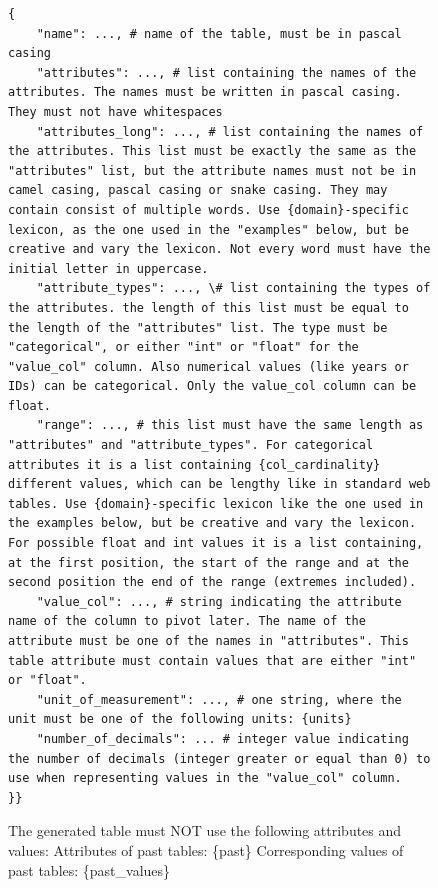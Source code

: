 \begin{figure}[t!]
\begin{tcolorbox}[
  title=Relational generation prompt,
  fonttitle=\bfseries,
  sharp corners=all
]
\begin{Verbatim}[fontsize=\small, breaklines=true, breakanywhere=true]
{
    "name": ..., # name of the table, must be in pascal casing
    "attributes": ..., # list containing the names of the attributes. The names must be written in pascal casing. They must not have whitespaces
    "attributes_long": ..., # list containing the names of the attributes. This list must be exactly the same as the "attributes" list, but the attribute names must not be in camel casing, pascal casing or snake casing. They may contain consist of multiple words. Use {domain}-specific lexicon, as the one used in the "examples" below, but be creative and vary the lexicon. Not every word must have the initial letter in uppercase.
    "attribute_types": ..., \# list containing the types of the attributes. the length of this list must be equal to the length of the "attributes" list. The type must be "categorical", or either "int" or "float" for the "value_col" column. Also numerical values (like years or IDs) can be categorical. Only the value_col column can be float.
    "range": ..., # this list must have the same length as "attributes" and "attribute_types". For categorical attributes it is a list containing {col_cardinality} different values, which can be lengthy like in standard web tables. Use {domain}-specific lexicon like the one used in the examples below, but be creative and vary the lexicon. For possible float and int values it is a list containing, at the first position, the start of the range and at the second position the end of the range (extremes included).
    "value_col": ..., # string indicating the attribute name of the column to pivot later. The name of the attribute must be one of the names in "attributes". This table attribute must contain values that are either "int" or "float". 
    "unit_of_measurement": ..., # one string, where the unit must be one of the following units: {units}
    "number_of_decimals": ... # integer value indicating the number of decimals (integer greater or equal than 0) to use when representing values in the "value_col" column.
}}
\end{Verbatim}

The generated table must NOT use the following attributes and values:
Attributes of past tables: \{past\}
Corresponding values of past tables: \{past\_values\}


\end{tcolorbox}
\end{figure}
